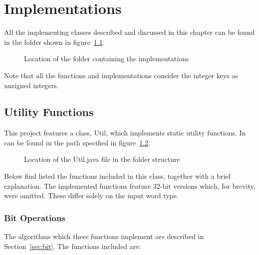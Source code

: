 \chapter{Implementations} \label{sec:implementationsChapter}

All the implementing classes described and discussed in this chapter can be found in the folder shown in figure~\ref{fig:implementationsFolderTree}.

\begin{figure}[H]
\caption{Location of the folder containing the implementations}
\label{fig:implementationsFolderTree}
\end{figure}

Note that all the functions and implementations consider the integer keys as unsigned integers.

\section{Utility Functions} \label{sec:utilFuctionsImplementation}

This project features a class, {\ttfamily Util}, which implements static utility functions. In can be found in the path specified in figure~\ref{fig:utilFunctionsTree}.

\begin{figure}[H]
\caption{Location of the {\ttfamily Util.java} file in the folder structure}
\label{fig:utilFunctionsTree}
\end{figure}

Below find listed the functions included in this class, together with a brief explanation.
The implemented functions feature 32-bit versions which, for brevity, were omitted. These differ solely on the input word type.

\subsection{Bit Operations}
The algorithms which these functions implement are described in Section~\ref{sec:bit}.
The functions included are:

